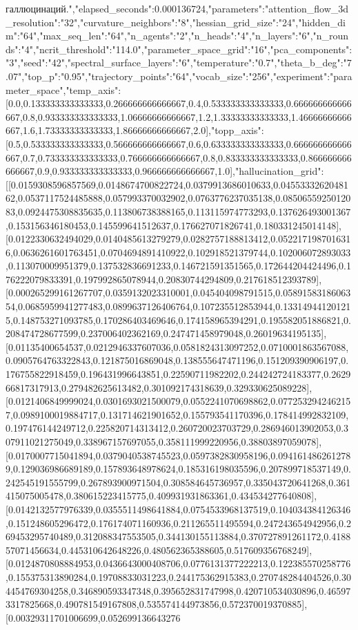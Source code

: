 \documentclass{article}
\begin{document}
галлюцинаций.","elapsed_seconds":0.000136724,"parameters":{"attention_flow_3d_resolution":"32","curvature_neighbors":"8","hessian_grid_size":"24","hidden_dim":"64","max_seq_len":"64","n_agents":"2","n_heads":"4","n_layers":"6","n_rounds":"4","ncrit_threshold":"114.0","parameter_space_grid":"16","pca_components":"3","seed":"42","spectral_surface_layers":"6","temperature":"0.7","theta_b_deg":"7.07","top_p":"0.95","trajectory_points":"64","vocab_size":"256"},"experiment":"parameter_space","temp_axis":[0.0,0.133333333333333,0.266666666666667,0.4,0.533333333333333,0.666666666666667,0.8,0.933333333333333,1.06666666666667,1.2,1.33333333333333,1.46666666666667,1.6,1.73333333333333,1.86666666666667,2.0],"topp_axis":[0.5,0.533333333333333,0.566666666666667,0.6,0.633333333333333,0.666666666666667,0.7,0.733333333333333,0.766666666666667,0.8,0.833333333333333,0.866666666666667,0.9,0.933333333333333,0.966666666666667,1.0],"hallucination_grid":[[0.0159308596857569,0.0148674700822724,0.0379913686010633,0.0455333262048162,0.0537117524485888,0.057993370032902,0.0763776237035138,0.0850655925012083,0.0924475308835635,0.113806738388165,0.113115974773293,0.137626493001367,0.153156346180453,0.145599641512637,0.176627071826741,0.180331245014148],[0.0122330632494029,0.0140485613279279,0.0282757188813412,0.0522171987016316,0.0636261601763451,0.0704694891410922,0.102918521379744,0.102006072893033,0.113070009951379,0.137532836691233,0.146721591351565,0.172644204424496,0.176222079833391,0.197992865078944,0.20830744294809,0.217618512393789],[0.000265299161267707,0.0359132023310001,0.045404098791515,0.0589158318606354,0.0685959941277483,0.0899637126406764,0.107235512853944,0.133149441201215,0.148753271093785,0.170286403469646,0.174158965394291,0.195582051886821,0.208474728677599,0.237006402362169,0.247471458979048,0.26019634195135],[0.01135400654537,0.0212946337607036,0.0581824313097252,0.0710001863567088,0.0905764763322843,0.121875016869048,0.138555647471196,0.151209390906197,0.176755822918459,0.196431996643851,0.22590711982202,0.244242724183377,0.262966817317913,0.279482625613482,0.301092174318639,0.329330625089228],[0.0121406849999024,0.0301693021500079,0.0552241070698862,0.0772532942462157,0.0989100019884717,0.131714621901652,0.155793541170396,0.178414992832109,0.197476144249712,0.225820714313412,0.260720023703729,0.286946013902053,0.307911021275049,0.338967157697055,0.358111999220956,0.38803897059078],[0.0170007715041894,0.0379040538745523,0.0597382830958196,0.0941614862612789,0.129036986689189,0.157893648978624,0.185316198035596,0.207899718537149,0.242545191555799,0.267893900971504,0.308584645736957,0.335043720641268,0.361415075005478,0.380615223415775,0.409931931863361,0.434534277640808],[0.0142132577976339,0.0355511498641884,0.0754533968137519,0.104034384126346,0.151248605296472,0.176174071160936,0.211265511495594,0.247243654942956,0.269453295740489,0.312088347553505,0.344130155113884,0.370727891261172,0.418857071456634,0.445310642648226,0.480562365388605,0.517609356768249],[0.0124870808884953,0.0436643000408706,0.0776131377222213,0.122385570258776,0.155375313890284,0.19708833031223,0.244175362915383,0.270748284404526,0.304454769304258,0.346890593347348,0.395652831747998,0.420710534030896,0.465973317825668,0.490781549167808,0.535574144973856,0.572370019370885],[0.00329311701006699,0.052699136643276
\end{document}
